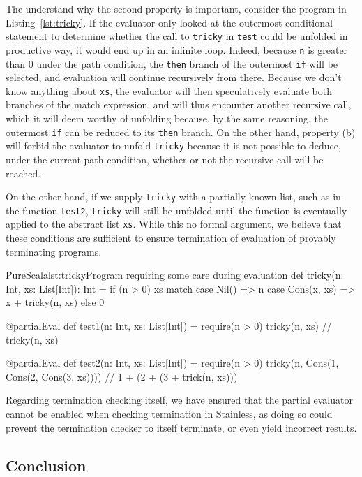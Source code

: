 \documentclass[a4paper,twoside]{article}
\newcommand{\InlineS}[1]{\lstinline[language=PureScala,basicstyle=\small\ttfamily,columns=fixed]|#1|}
\newcommand{\RefCode}[1]{Listing~\ref{#1}}
\newcommand{\stt}[1]{\texttt{\small{#1}}}
\begin{document}
The understand why the second property is important, consider the program in  \RefCode{lst:tricky}. If the evaluator only looked at the outermost conditional statement to determine whether the call to \stt{tricky} in \stt{test} could be unfolded in productive way, it would end up in an infinite loop. Indeed, because \stt{n} is greater than 0 under the path condition, the \stt{then} branch of the outermost \InlineS{if} will be selected, and evaluation will continue recursively from there. Because we don't know anything about \stt{xs}, the evaluator will then speculatively evaluate both branches of the match expression, and will thus encounter another recursive call, which it will deem worthy of unfolding because, by the same reasoning,  the outermost \InlineS{if} can be reduced to its \stt{then} branch. On the other hand, property (b) will forbid the evaluator to unfold \stt{tricky} because it is not possible to deduce, under the current path condition, whether or not the recursive call will be reached.

On the other hand, if we supply \stt{tricky} with a partially known list, such as in the function \stt{test2}, \stt{tricky} will still be unfolded until the function is eventually applied to the abstract list \stt{xs}. While this no formal argument, we believe that these conditions are sufficient to ensure termination of evaluation of provably terminating programs.\\

\begin{Code}{PureScala}{lst:tricky}{Program requiring some care during evaluation}
def tricky(n: Int, xs: List[Int]): Int = {
  if (n > 0) {
    xs match {
      case Nil()       => n
      case Cons(x, xs) => x + tricky(n, xs)
    }
  } else {
    0
  }
}

@partialEval
def test1(n: Int, xs: List[Int]) = {
  require(n > 0)
  tricky(n, xs) // tricky(n, xs)
}

@partialEval
def test2(n: Int, xs: List[Int]) = {
  require(n > 0)
  tricky(n, Cons(1, Cons(2, Cons(3, xs)))) // 1 + (2 + (3 + trick(n, xs)))
}
\end{Code}

Regarding termination checking itself, we have ensured that the partial evaluator cannot be enabled when checking termination in Stainless, as doing so could prevent the termination checker to itself terminate, or even yield incorrect results.

\subsection{Conclusion}
\end{document}
